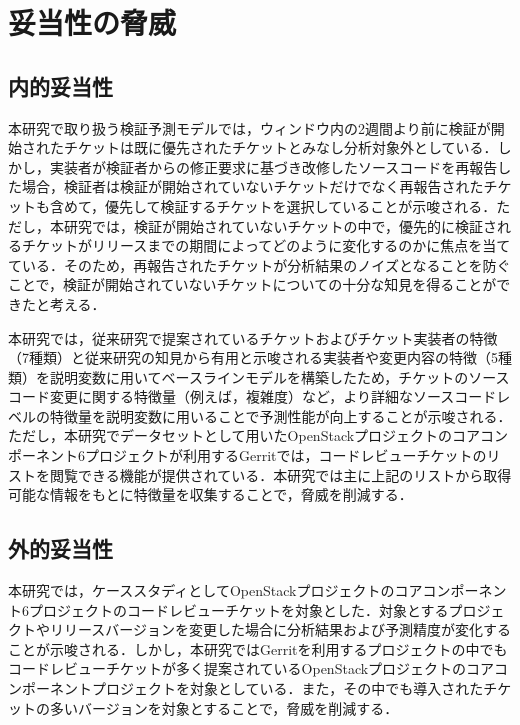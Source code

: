 \documentclass[11pt]{jreport}
\begin{document}
\chapter{妥当性の脅威}\label{sec:disc}

\section{内的妥当性}
本研究で取り扱う検証予測モデルでは，ウィンドウ内の2週間より前に検証が開始されたチケットは既に優先されたチケットとみなし分析対象外としている．しかし，実装者が検証者からの修正要求に基づき改修したソースコードを再報告した場合，検証者は検証が開始されていないチケットだけでなく再報告されたチケットも含めて，優先して検証するチケットを選択していることが示唆される．ただし，本研究では，検証が開始されていないチケットの中で，優先的に検証されるチケットがリリースまでの期間によってどのように変化するのかに焦点を当てている．そのため，再報告されたチケットが分析結果のノイズとなることを防ぐことで，検証が開始されていないチケットについての十分な知見を得ることができたと考える．

本研究では，従来研究\cite{prioritizer}で提案されているチケットおよびチケット実装者の特徴（7種類）と従来研究\cite{release_merge}\cite{review1}の知見から有用と示唆される実装者や変更内容の特徴（5種類）を説明変数に用いてベースラインモデルを構築したため，チケットのソースコード変更に関する特徴量（例えば，複雑度）など，より詳細なソースコードレベルの特徴量を説明変数に用いることで予測性能が向上することが示唆される．ただし，本研究でデータセットとして用いたOpenStackプロジェクトのコアコンポーネント6プロジェクトが利用するGerritでは，コードレビューチケットのリストを閲覧できる機能が提供されている．本研究では主に上記のリストから取得可能な情報をもとに特徴量を収集することで，脅威を削減する．

\section{外的妥当性}
本研究では，ケーススタディとしてOpenStackプロジェクトのコアコンポーネント6プロジェクトのコードレビューチケットを対象とした．対象とするプロジェクトやリリースバージョンを変更した場合に分析結果および予測精度が変化することが示唆される．しかし，本研究ではGerritを利用するプロジェクトの中でもコードレビューチケットが多く提案されているOpenStackプロジェクトのコアコンポーネントプロジェクトを対象としている．また，その中でも導入されたチケットの多いバージョンを対象とすることで，脅威を削減する．
\end{document}
